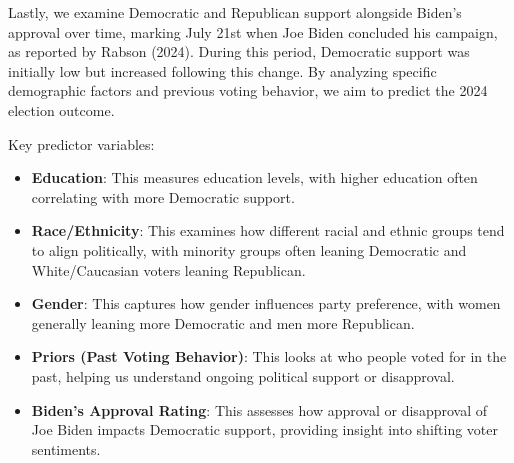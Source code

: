 \documentclass[
  letterpaper,
  DIV=11,
  numbers=noendperiod]{scrartcl}
\providecommand{\tightlist}{%
  \setlength{\itemsep}{0pt}\setlength{\parskip}{0pt}}\usepackage{longtable,booktabs,array}
\begin{document}
\begin{figure}


\caption{\label{fig-points-over-time}}

\end{figure}%

Lastly, we examine Democratic and Republican support alongside Biden's
approval over time, marking July 21st when Joe Biden concluded his
campaign, as reported by Rabson (2024). During this period, Democratic
support was initially low but increased following this change. By
analyzing specific demographic factors and previous voting behavior, we
aim to predict the 2024 election outcome.

Key predictor variables:

\begin{itemize}
\tightlist
\item
  \textbf{Education}: This measures education levels, with higher
  education often correlating with more Democratic support.
\item
  \textbf{Race/Ethnicity}: This examines how different racial and ethnic
  groups tend to align politically, with minority groups often leaning
  Democratic and White/Caucasian voters leaning Republican.
\item
  \textbf{Gender}: This captures how gender influences party preference,
  with women generally leaning more Democratic and men more Republican.
\item
  \textbf{Priors (Past Voting Behavior)}: This looks at who people voted
  for in the past, helping us understand ongoing political support or
  disapproval.
\item
  \textbf{Biden's Approval Rating}: This assesses how approval or
  disapproval of Joe Biden impacts Democratic support, providing insight
  into shifting voter sentiments.
\end{itemize}
\end{document}
